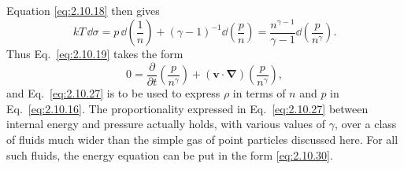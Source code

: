 Equation \eqref{eq:2.10.18} then gives
\begin{equation}
  kT\,\dd\sigma
  =p\,\dd\left(\frac1n\right)
   +(\gamma-1)^{-1}\dd\left(\frac pn\right)
  =\frac{n^{\gamma-1}}{\gamma-1}
   \dd\left(\frac{p}{n^\gamma}\right).
  \tag{2.10.29}\label{eq:2.10.29}
\end{equation}
Thus Eq.~\eqref{eq:2.10.19} takes the form
\begin{equation}
  0=\frac{\partial}{\partial t}\left(\frac{p}{n^\gamma}\right)
  +(\mathbf v\cdot\boldsymbol{\nabla})
   \left(\frac{p}{n^\gamma}\right),
  \tag{2.10.30}\label{eq:2.10.30}
\end{equation}
and Eq.~\eqref{eq:2.10.27} is to be used to express \(\rho\) in terms of
\(n\) and \(p\) in Eq.~\eqref{eq:2.10.16}. The proportionality expressed
in Eq.~\eqref{eq:2.10.27} between internal energy and pressure actually holds,
with various values of \(\gamma\), over a class of fluids much wider than the
simple gas of point particles discussed here. For all such fluids, the energy
equation can be put in the form \eqref{eq:2.10.30}.

